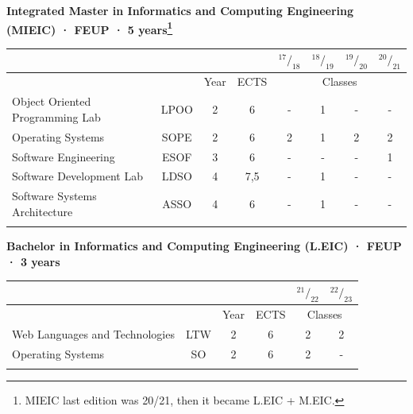 \documentclass[10pt,a4paper]{article}
\renewcommand{\arraystretch}{1}
\begin{document}
\textbf{Integrated Master in Informatics and Computing Engineering (MIEIC) · FEUP · 5 years\footnote{MIEIC last edition was 20/21, then it became L.EIC + M.EIC.}}
\begin{table}[H]
\renewcommand\arraystretch{.8}
\begin{tabular*}{\textwidth}{l @{\extracolsep{\fill}} ccccccc@{}}

&                      &                      &  & $^{17} / _{18}$ & $^{18} / _{19}$ & $^{19} / _{20}$   & $^{20} / _{21}$ \\ \midrule
&                      &     Year                 & \small{ECTS}                & \multicolumn{4}{c}{Classes}         \\ \midrule \addlinespace[0.2cm]
Object Oriented Programming Lab & \small{LPOO}                 & 2                    & 6                    & -                    & 1  & -   & -    \\\addlinespace[0.4cm]
Operating Systems                      & \small{SOPE}                 & 2                    & 6                    & 2               & 1         & 2   & 2   \\\addlinespace[0.4cm]
Software Engineering       & \small{ESOF}                 & 3                    & 6                  & -                    & -    & -          & 1 \\\addlinespace[0.4cm]
Software Development Lab       & \small{LDSO}                 & 4                    & 7,5                  & -                    & 1    & -          & -   \\\addlinespace[0.4cm]
Software Systems Architecture          & \small{ASSO}                 & 4                    & 6                    & -                    & 1    & -      & -   \\\addlinespace[0.2cm]\bottomrule
\end{tabular*}
\end{table}

\textbf{Bachelor in Informatics and Computing Engineering (L.EIC) · FEUP · 3 years}
\begin{table}[H]
\renewcommand\arraystretch{.98}
\begin{tabular*}{\textwidth}{l @{\extracolsep{\fill}} ccccc@{}}

&                      &                      &  & $^{21} / _{22}$ & $^{22} / _{23}$ \\ \midrule
&                      &     Year                 & \small{ECTS}                & \multicolumn{2}{c}{Classes}         \\ \midrule \addlinespace[0.2cm]
Web Languages and Technologies & \small{LTW}                 & 2                    & 6                    & 2 & 2 \\\addlinespace[0.4cm]
Operating Systems                      & \small{SO}                 & 2                    & 6                    & 2 &   -   \\\addlinespace[0.2cm]\bottomrule
\end{tabular*}
\end{table}
\end{document}
